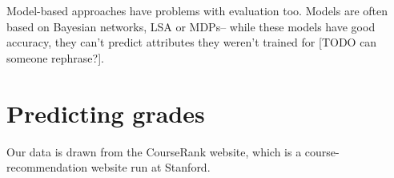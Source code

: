 \documentclass{article} %
\begin{document}
Model-based approaches have problems with evaluation too. Models are often based on Bayesian networks, LSA or MDPs-- while these models have good accuracy, they can't predict attributes they weren't trained for [TODO can someone rephrase?].

\section{Predicting grades}
Our data is drawn from the CourseRank website, which is a course-recommendation website run at Stanford.






%


\end{document}
